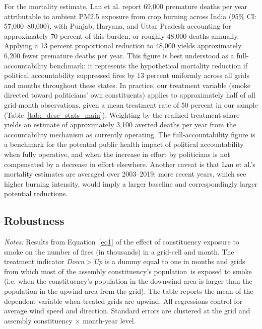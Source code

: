 \documentclass[12pt]{article}
\providecommand{\resultsuffix}{}
\let\SourceInput
\renewcommand{}[1]{%
  \IfFileExists{../../#1\resultsuffix.tex}{\SourceInput{../../#1\resultsuffix.tex}}{%
  \IfFileExists{../../#1}{\SourceInput{../../#1}}{%
    \IfFileExists{../../#1.tex}{\SourceInput{../../#1.tex}}{%
      \fbox{\scriptsize Missing table: \detokenize{#1}}}}}}
\begin{document}
For the mortality estimate, Lan et al. report 69,000 premature deaths per year attributable to ambient PM2.5 exposure from crop burning across India (95\% CI: 57,000–80,000), with Punjab, Haryana, and Uttar Pradesh accounting for approximately 70 percent of this burden, or roughly 48,000 deaths annually. Applying a 13 percent proportional reduction to 48,000 yields approximately 6,200 fewer premature deaths per year. This figure is best understood as a full-accountability benchmark: it represents the hypothetical mortality reduction if political accountability suppressed fires by 13 percent uniformly across all grids and months throughout these states. In practice, our treatment variable (smoke directed toward politicians' own constituents) applies to approximately half of all grid-month observations, given a mean treatment rate of 50 percent in our sample (Table~\ref{tab:_desc_stats_main}). Weighting by the realized treatment share yields an estimate of approximately 3,100 averted deaths per year from the accountability mechanism as currently operating. The full-accountability figure is a benchmark for the potential public health impact of political accountability when fully operative, and when the increase in effort by politicians is not compensated by a decrease in effort elsewhere. Another caveat is that Lan et al.'s mortality estimates are averaged over 2003–2019; more recent years, which see higher burning intensity, would imply a larger baseline and correspondingly larger potential reductions.



\newpage 
\subsection{Robustness}




 \begin{table}[htbp!]
     \centering
     \caption{Effect of constituency exposure to smoke on number of fires, DID specification \label{tab:main_DID}}
     \resizebox{0.8\textwidth}{!}{
    
      }
     \begin{minipage}{\textwidth}
         {\small \textit{Notes: } Results from Equation~\ref{eq1} of the effect of constituency exposure to smoke on the number of fires (in thousands) in a grid-cell and month. The treatment indicator \textit{Down$>$Up} is a dummy equal to one in months and grids from which most of the assembly constituency's population\ is exposed to smoke (i.e. when the constituency's population in the downwind area is larger than the population in the  upwind area from the grid). The table reports the mean of the dependent variable when treated grids are upwind. All regressions control for average wind speed and direction. Standard errors are clustered at the grid and assembly constituency $\times$ month-year level. }
     \end{minipage}
 \end{table}
\end{document}
